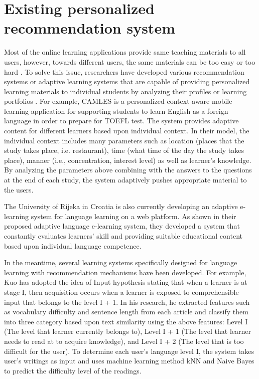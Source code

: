 \section{Existing personalized recommendation system}

Most of the online learning applications provide same teaching materials to all users, however, towards different users, the same materials can be too easy or too hard \cite{Tang2005}. To solve this issue, researchers have developed various recommendation systems or adaptive learning systems that are capable of providing personalized learning materials to individual students by analyzing their profiles or learning portfolios \cite{Hsu2013, Kuo2014}. For example, CAMLES \cite{Nguyen2010} is a personalized context-aware mobile learning application for supporting students to learn English as a foreign language in order to prepare for TOEFL test. The system provides adaptive content for different learners based upon individual context. In their model, the individual context includes many parameters such as location (places that the study takes place, i.e. restaurant), time (what time of the day the study takes place), manner (i.e., concentration, interest level) as well as learner's knowledge. By analyzing the parameters above combining with the answers to the questions at the end of each study, the system adaptively pushes appropriate material to the users. 

The University of Rijeka in Croatia is also currently developing an adaptive e-learning system for language learning on a web platform. \cite{jugo2016increasing} As shown in their proposed adaptive language e-learning system, they developed a system that constantly evaluates learners' skill and providing suitable educational content based upon individual language competence. 

In the meantime, several learning systems specifically designed for language learning with recommendation mechanisms have been developed. For example, Kuo \cite{Kuo2014} has adopted the idea of Input hypothesis \cite{Krashen1987} stating that when a learner is at stage I, then acquisition occurs when a learner is exposed to comprehensible input that belongs to the level I + 1. In his research, he extracted features such as vocabulary difficulty and sentence length from each article and classify them into three category based upon text similarity using the above features: Level I (The level that learner currently belongs to), Level I + 1 (The level that learner needs to read at to acquire knowledge), and Level I + 2 (The level that is too difficult for the user). To determine each user's language level I, the system takes user's writings as input and uses machine learning method kNN and Naive Bayes to predict the difficulty level of the readings. 

